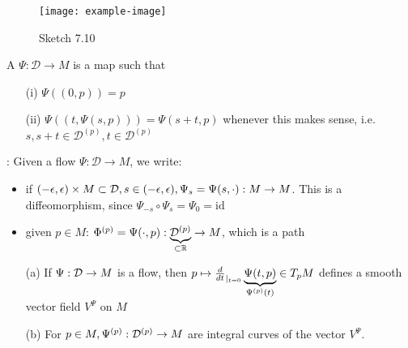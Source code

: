 \begin{example}
    \begin{figure}[H]\label{fig:7.10}
        \centering
        \texttt{[image: example-image]}
        \caption{Sketch 7.10}
    \end{figure}
\end{example}

\begin{definition*}
    A  \(\Psi:\mathcal{D}\to M\) is a map such that 
    \begin{enumerate}
        \item[(i)] \(\Psi((0,p))=p\)
        \item[(ii)] \(\Psi((t,\Psi(s,p)))=\Psi(s+t,p)\) whenever this makes sense, i.e. \(s,s+t\in\mathcal{D}^{(p)},t\in \mathcal{D}^{(p)}\)   
    \end{enumerate}
\end{definition*}

: Given a flow \(\Psi:\mathcal{D}\to M\), we write:
\begin{itemize}
    \item if \((-\epsilon,\epsilon)\times M\subset \mathcal{D}, s\in (-\epsilon,\epsilon),\Psi_s=\Psi(s,\cdot):M\to M\). This is a diffeomorphism, since \(\Psi_{-s}\circ \Psi_s=\Psi_0=\text{id}\)
    \item given \(p\in M\): \(\Phi^{(p)}=\Psi(\cdot,p):\underbrace{\mathcal{D}^{(p)}}_{\subset \mathbb{R}}\to M\), which is a path
\end{itemize}

\begin{lemma}\label{lem:7.11}
    \begin{enumerate}
        \item[(a)] If \(\Psi:\mathcal{D}\to M\) is a flow, then \(p\mapsto \frac{d}{dt}_{|_{t=0}}\underbrace{\Psi(t,p)}_{\Psi^{(p)}(t)}\in T_p M\)  defines a smooth vector field \(V^{\Psi}\) on \(M\)
        \item[(b)] For \(p\in M,\Psi^{(p)}:\mathcal{D}^{(p)}\to M\) are integral curves of the vector \(V^{\Psi}\). 
    \end{enumerate}
\end{lemma}

